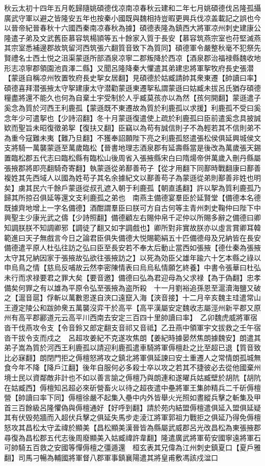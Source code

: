秋云太初十四年五月乾歸隨姚碩德伐凉南凉春秋云建和二年七月姚碩德伐呂隆孤攝廣武守軍以避之皆隆安五年也按秦小國既與魏相持豈暇更興兵伐凉盖載記之誤也今以晉帝紀晉春秋十六國西秦南凉春秋為據】碩德表隆為鎮西大將軍凉州刺史建康公隆遣子弟及文武舊臣慕容筑楊頴等五十餘家入質于長安【慕容筑燕宗室也苻堅滅燕其宗室悉補邊郡故筑留河西筑張六翻質音致下為質同】碩德軍令嚴整秋毫不犯祭先賢禮名士西土悦之沮渠蒙遜所部酒泉凉寧二郡叛降於西凉【酒泉郡治福禄縣魏收地形志凉寧郡領園池貢澤二縣】又聞呂隆降秦大懼遣其弟建忠將軍挐牧府長史張潜【蒙遜自稱凉州牧置牧府長史挐女居翻】見碩德於姑臧請帥其衆東遷【帥讀曰率】碩德喜拜潜張掖太守挐建康太守潜勸蒙遜東遷挐私謂蒙遜曰姑臧未拔呂氏猶存碩德糧盡將還不能久也何為自棄土宇受制於人乎臧莫孩亦以為然【孩何開翻】蒙遜遣子奚念為質於河西王利鹿孤【蒙遜既不東遷故為質於利鹿孤以求援】利鹿孤不受曰奚念年少可遣挐也【少詩沼翻】冬十月蒙遜復遣使上疏於利鹿孤曰臣前遣奚念具披誠欵而聖旨未昭復徵弟挐【復扶又翻】臣竊以為苟有誠信則子不為輕若其不信則弟不為重今寇難未夷【難乃旦翻】不獲奉詔願陛下亮之利鹿孤怒遣張松侯俱延興城侯文支將騎一萬襲蒙遜至萬歲臨松【晉書地理志酒泉郡有延壽縣當是後改為萬歲張天錫置臨松郡五代志曰臨松縣有臨松山後周省入張掖縣宋白曰隋煬帝併萬歲入刪丹縣屬張掖郡將即亮翻騎奇寄翻】執蒙遜從弟鄯善苟子【從才用翻下同鄯時戰翻康曰鄯善複姓其先西域人以國為姓苟子其名余據紀文以鄯善苟子為蒙遜從弟則鄯善非姓也明矣】虜其民六千餘戶蒙遜從叔孔遮入朝于利鹿孤【朝直遙翻】許以挐為質利鹿孤乃歸其所掠召俱延等還文支利鹿孤之弟也　南燕主備德宴羣臣於延賢堂【備德本名德既據齊地增上一字名備德】酒酣謂羣臣曰朕可方自古何等主青州刺史鞠仲曰陛下中興聖主少康光武之儔【少詩照翻】備德顧左右賜仲帛千疋仲以所賜多辭之備德曰卿知調朕朕不知調卿邪【調徒了翻又如字調戲也】卿所對非實故朕亦以虛言賞卿耳韓範進曰天子無戲言今日之論君臣俱失備德大悦賜範絹五十匹備德母及兄納皆在長安備德遣平原人杜弘往訪之弘曰臣至長安若不奉太后動止當西如張掖【德仕秦為張掖太守其兄納因家于張掖故弘欲往張掖訪之】以死為効臣父雄年踰六十乞本縣之祿以申烏鳥之情【慈烏反哺故云然李密陳情表曰烏烏私情願乞終養】中書令張華曰杜弘未行而求禄要君之罪大矣【要音邀】備德曰弘為君迎母為父求禄【為于偽翻】忠孝備矣何罪之有以雄為平原令弘至張掖為盗所殺　十一月劉裕追孫恩至滬瀆海鹽又破之【滬音扈】俘斬以萬數恩遂自浹口遠竄入海【浹音接】十二月辛亥魏主珪遣常山王遵定陵公和跋帥衆五萬襲沒弈干於高平【高平漢屬安定魏收志屬涇州新平郡又原州有高平郡酈道元云高平川西南去安定三百四十里帥讀曰率】　乙卯魏虎威將軍宿沓干伐燕攻令支【令音鈴又郎定翻支音祁又音祗】乙丑燕中領軍宇文拔救之壬午宿沓干拔令支而戍之　呂超攻姜紀不克遂攻焦朗【姜紀時據晏然焦朗據魏安】朗遣其弟子嵩為質於河西王利鹿孤以請迎利鹿孤遣車騎將軍傉檀赴之比至超已退【質音致比必寐翻】朗閉門拒之傉檀怒將攻之鎮北將軍俱延諫曰安土重遷人之常情朗孤城無食今年不降【降戶江翻】後年自服何必多殺士卒以攻之若其不捷彼必去從他國棄州境士民以資鄰敵非計也不如以善言諭之傉檀乃與朗連和遂曜兵姑臧壁於胡阬【胡阬在姑臧西】傉檀知呂超必來斫營畜火以待之超夜遣中壘將軍王集帥精兵二千斫傉檀營【帥讀曰率下同】傉檀徐嚴不起集入壘中内外皆舉火光照如晝縱兵擊之斬集及甲首三百餘級呂隆懼偽與傉檀通好【好呼到翻】請於苑内結盟傉檀遣俱延入盟俱延疑其有伏毁苑牆而入超伏兵擊之俱延失馬步走淩江將軍郭祖力戰拒之俱延乃得免傉檀怒攻其昌松太守孟禕於顯美【昌松顯美漢晉皆為縣屬武威郡呂光改昌松為東張掖郡尋復為昌松郡五代志後周廢顯美入姑臧禕許韋翻】隆遣廣武將軍荀安國寧遠將軍石可帥騎五百救之安國等憚傉檀之彊遁還　桓玄表其兄偉為江州刺史鎮夏口【夏戶雅翻】司馬刁暢為輔國將軍督八郡軍事鎮襄陽遣其將皇甫敷馮該戍湓口